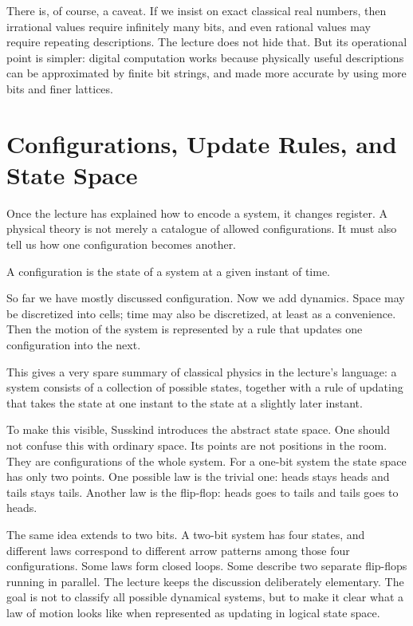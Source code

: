 There is, of course, a caveat. If we insist on exact classical real numbers, then irrational values require infinitely many bits, and even rational values may require repeating descriptions. The lecture does not hide that. But its operational point is simpler: digital computation works because physically useful descriptions can be approximated by finite bit strings, and made more accurate by using more bits and finer lattices.

\section{Configurations, Update Rules, and State Space}

Once the lecture has explained how to encode a system, it changes register. A physical theory is not merely a catalogue of allowed configurations. It must also tell us how one configuration becomes another.

\begin{definition}
A configuration is the state of a system at a given instant of time.
\end{definition}

So far we have mostly discussed configuration. Now we add dynamics. Space may be discretized into cells; time may also be discretized, at least as a convenience. Then the motion of the system is represented by a rule that updates one configuration into the next.

This gives a very spare summary of classical physics in the lecture's language: a system consists of a collection of possible states, together with a rule of updating that takes the state at one instant to the state at a slightly later instant.

To make this visible, Susskind introduces the abstract state space. One should not confuse this with ordinary space. Its points are not positions in the room. They are configurations of the whole system. For a one-bit system the state space has only two points. One possible law is the trivial one: heads stays heads and tails stays tails. Another law is the flip-flop: heads goes to tails and tails goes to heads.

The same idea extends to two bits. A two-bit system has four states, and different laws correspond to different arrow patterns among those four configurations. Some laws form closed loops. Some describe two separate flip-flops running in parallel. The lecture keeps the discussion deliberately elementary. The goal is not to classify all possible dynamical systems, but to make it clear what a law of motion looks like when represented as updating in logical state space.

